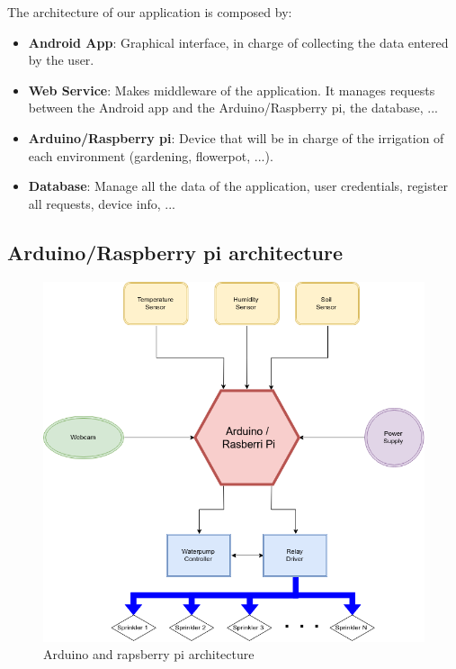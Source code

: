 \documentclass[11pt,a4paper]{article}
\begin{document}
The architecture of our application is composed by:
\begin{itemize}
\item \textbf{Android App}: Graphical interface, in charge of collecting the data entered by the user.
\item \textbf{Web Service}: Makes middleware of the application. It manages requests between the Android app and the Arduino/Raspberry pi, the database, ...
\item \textbf{Arduino/Raspberry pi}: Device that will be in charge of the irrigation of each environment (gardening, flowerpot, ...).
\item \textbf{Database}: Manage all the data of the application, user credentials, register all requests, device info, ...
\end{itemize}

\newpage

\subsection{Arduino/Raspberry pi architecture}
\vspace*{3cm}
\begin{figure}[hbtp]
\centering
\includegraphics[scale=0.6]{figures/ArduinoArch.png}
\caption{Arduino and rapsberry pi architecture}
\end{figure}
\end{document}
